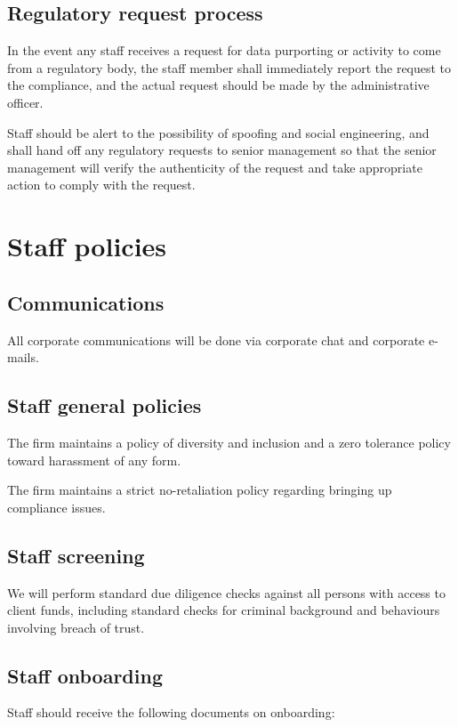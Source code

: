 \subsection{Regulatory request process}
\label{label:regrequest}
In the event any staff receives a request for data purporting or
activity to come from a regulatory body, the staff member shall
immediately report the request to the compliance, and the actual
request should be made by the administrative officer.

Staff should be alert to the possibility of spoofing and social
engineering, and shall hand off any regulatory requests to senior
management so that the senior management will verify the authenticity
of the request and take appropriate action to comply with the request.

\section{Staff policies}

\subsection{Communications}
All corporate communications will be done via corporate chat and
corporate e-mails.

\subsection{Staff general policies}

The firm maintains a policy of diversity and inclusion and a zero
tolerance policy toward harassment of any form.

The firm maintains a strict no-retaliation policy regarding bringing up
compliance issues.

\subsection{Staff screening}
We will perform standard due diligence checks against all persons with
access to client funds, including standard checks for criminal
background and behaviours involving breach of trust.

\subsection{Staff onboarding}

Staff should receive the following documents on onboarding:

